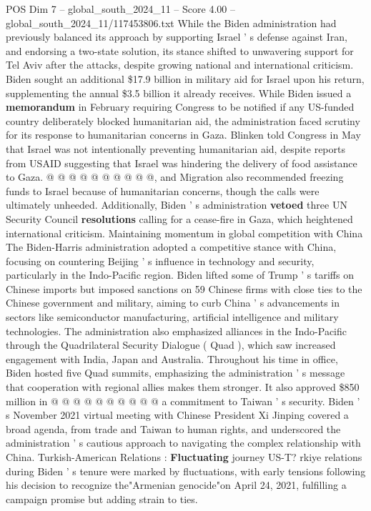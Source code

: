 \begin{textsample}{POS Dim 7 – global\_south\_2024\_11 – Score 4.00 – global\_south\_2024\_11/117453806.txt}
While the Biden administration had previously balanced its approach by supporting Israel ' s defense against Iran, and endorsing a two-state solution, its stance shifted to unwavering support for Tel Aviv after the attacks, despite growing national and international criticism.
Biden sought an additional \$17.9 billion in military aid for Israel upon his return, supplementing the annual \$3.5 billion it already receives.
While Biden issued a \textbf{memorandum} in February requiring Congress to be notified if any US-funded country deliberately blocked humanitarian aid, the administration faced scrutiny for its response to humanitarian concerns in Gaza.
Blinken told Congress in May that Israel was not intentionally preventing humanitarian aid, despite reports from USAID suggesting that Israel was hindering the delivery of food assistance to Gaza. @ @ @ @ @ @ @ @ @ @, and Migration also recommended freezing funds to Israel because of humanitarian concerns, though the calls were ultimately unheeded.
Additionally, Biden ' s administration \textbf{vetoed} three UN Security Council \textbf{resolutions} calling for a cease-fire in Gaza, which heightened international criticism.
Maintaining momentum in global competition with China The Biden-Harris administration adopted a competitive stance with China, focusing on countering Beijing ' s influence in technology and security, particularly in the Indo-Pacific region.
Biden lifted some of Trump ' s tariffs on Chinese imports but imposed sanctions on 59 Chinese firms with close ties to the Chinese government and military, aiming to curb China ' s advancements in sectors like semiconductor manufacturing, artificial intelligence and military technologies.
The administration also emphasized alliances in the Indo-Pacific through the Quadrilateral Security Dialogue ( Quad ), which saw increased engagement with India, Japan and Australia.
Throughout his time in office, Biden hosted five Quad summits, emphasizing the administration ' s message that cooperation with regional allies makes them stronger.
It also approved \$850 million in @ @ @ @ @ @ @ @ @ @ a commitment to Taiwan ' s security.
Biden ' s November 2021 virtual meeting with Chinese President Xi Jinping covered a broad agenda, from trade and Taiwan to human rights, and underscored the administration ' s cautious approach to navigating the complex relationship with China.
Turkish-American Relations : \textbf{Fluctuating} journey US-T? rkiye relations during Biden ' s tenure were marked by fluctuations, with early tensions following his decision to recognize the"Armenian genocide"on April 24, 2021, fulfilling a campaign promise but adding strain to ties.

\end{textsample}
